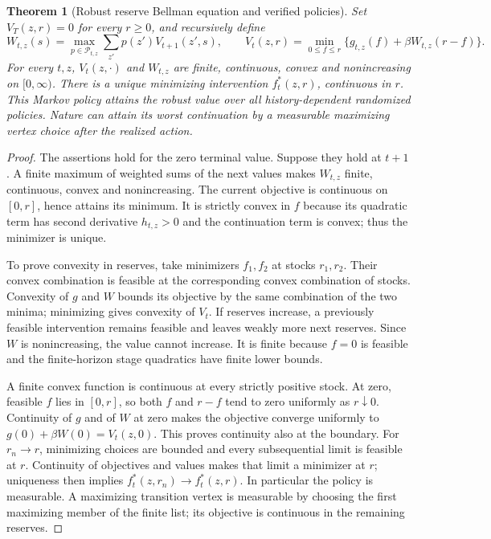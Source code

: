 \documentclass[11pt]{article}
\newtheorem{theorem}{Theorem}
\theoremstyle{definition}
\begin{document}
\begin{theorem}[Robust reserve Bellman equation and verified policies]
Set $V_T(z,r)=0$ for every $r\geq0$, and recursively define
\[
 W_{t,z}(s)=\max_{p\in\mathcal P_{t,z}}
                 \sum_{z'}p(z')V_{t+1}(z',s),
 \qquad
 V_t(z,r)=\min_{0\leq f\leq r}
                 \{g_{t,z}(f)+\beta W_{t,z}(r-f)\}.
\]
For every $t,z$, $V_t(z,\cdot)$ and $W_{t,z}$ are finite, continuous,
convex and nonincreasing on $[0,\infty)$. There is a unique minimizing
intervention $f_t^*(z,r)$, continuous in $r$. This Markov policy attains
the robust value over all history-dependent randomized policies. Nature
can attain its worst continuation by a measurable maximizing vertex choice
after the realized action.
\end{theorem}
\begin{proof}
The assertions hold for the zero terminal value. Suppose they hold at
$t+1$. A finite maximum of weighted sums of the next values makes
$W_{t,z}$ finite, continuous, convex and nonincreasing. The current
objective is continuous on $[0,r]$, hence attains its minimum. It is
strictly convex in $f$ because its quadratic term has second derivative
$h_{t,z}>0$ and the continuation term is convex; thus the minimizer is
unique.

To prove convexity in reserves, take minimizers $f_1,f_2$ at stocks
$r_1,r_2$. Their convex combination is feasible at the corresponding
convex combination of stocks. Convexity of $g$ and $W$ bounds its objective
by the same combination of the two minima; minimizing gives convexity of
$V_t$. If reserves increase, a previously feasible intervention remains
feasible and leaves weakly more next reserves. Since $W$ is nonincreasing,
the value cannot increase. It is finite because $f=0$ is feasible and
the finite-horizon stage quadratics have finite lower bounds.

A finite convex function is continuous at every strictly positive stock.
At zero, feasible $f$ lies in $[0,r]$, so both $f$ and $r-f$ tend to zero
uniformly as $r\downarrow0$. Continuity of $g$ and of $W$ at zero makes
the objective converge uniformly to $g(0)+\beta W(0)=V_t(z,0)$.
This proves continuity also at the boundary. For $r_n\to r$, minimizing
choices are bounded and every subsequential limit is feasible at $r$.
Continuity of objectives and values makes that limit a minimizer at $r$;
uniqueness then implies $f_t^*(z,r_n)\to f_t^*(z,r)$. In particular the
policy is measurable. A maximizing transition vertex is measurable by
choosing the first maximizing member of the finite list; its objective
is continuous in the remaining reserves.


\end{proof}
\end{document}
